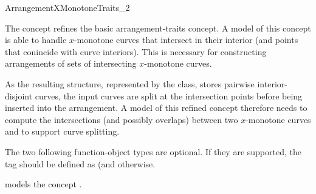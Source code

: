 
\ccRefPageBegin
\begin{ccRefConcept}{ArrangementXMonotoneTraits_2}

\ccThreeToTwo

\ccDefinition
The concept\ccRefName{} refines the basic arrangement-traits concept.
A model of this concept is able to handle $x$-monotone curves that
intersect in their interior (and points that conincide with curve
interiors). This is necessary for constructing arrangements of sets of
intersecting $x$-monotone curves.

As the resulting structure, represented by the  class,
stores pairwise interior-disjoint curves, the input curves are split at
the intersection points before being inserted into the arrangement. 
A model of this refined concept therefore needs to compute the intersections
(and possibly overlaps) between two $x$-monotone curves and to support
curve splitting.

\ccRefines
{}

\ccTypes

\ccThreeToTwo
{}
\ccGlue
{}

The two following function-object types are optional. If they are
supported, the  tag should be defined as
 (and  otherwise.

%
  {models the concept .}
\ccGlue
{}

\ccThreeToTwo


 {}
\ccGlue
{} {}


\end{ccRefConcept}
